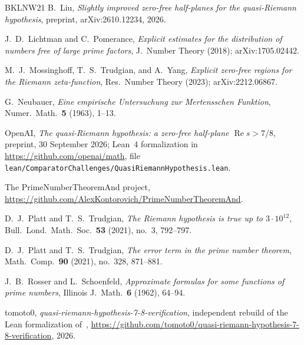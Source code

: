 \documentclass{amsart}
\theoremstyle{definition}
\theoremstyle{remark}
\theoremstyle{plain}
\numberwithin{equation}{section}
\begin{document}
\begin{thebibliography}{BKLNW21}
B.~Liu, \emph{Slightly improved zero-free half-planes for the quasi-Riemann hypothesis}, preprint, arXiv:2610.12234, 2026.

J.~D.~Lichtman and C.~Pomerance, \emph{Explicit estimates for the distribution of numbers free of large prime factors}, J.\ Number Theory (2018); arXiv:1705.02442.

M.~J.~Mossinghoff, T.~S.~Trudgian, and A.~Yang, \emph{Explicit zero-free regions for the Riemann zeta-function}, Res.\ Number Theory (2023); arXiv:2212.06867.

G.~Neubauer, \emph{Eine empirische Untersuchung zur Mertensschen Funktion}, Numer.\ Math.\ \textbf{5} (1963), 1--13.

OpenAI, \emph{The quasi-Riemann hypothesis: a zero-free half-plane $\operatorname{Re}s>7/8$}, preprint, 30 September 2026; Lean~4 formalization in \url{https://github.com/openai/math}, file \texttt{lean/Comparator\-Challenges/Quasi\-Riemann\-Hypothesis.lean}.

The PrimeNumberTheoremAnd project, \url{https://github.com/AlexKontorovich/PrimeNumberTheoremAnd}.

D.~J.~Platt and T.~S.~Trudgian, \emph{The Riemann hypothesis is true up to $3\cdot10^{12}$}, Bull.\ Lond.\ Math.\ Soc.\ \textbf{53} (2021), no.~3, 792--797.

D.~J.~Platt and T.~S.~Trudgian, \emph{The error term in the prime number theorem}, Math.\ Comp.\ \textbf{90} (2021), no.~328, 871--881.

J.~B.~Rosser and L.~Schoenfeld, \emph{Approximate formulas for some functions of prime numbers}, Illinois J.\ Math.\ \textbf{6} (1962), 64--94.

tomoto0, \emph{quasi-riemann-hypothesis-7-8-verification}, independent rebuild of the Lean formalization of~\cite{OAI26}, \url{https://github.com/tomoto0/quasi-riemann-hypothesis-7-8-verification}, 2026.

\end{thebibliography}
\end{document}
